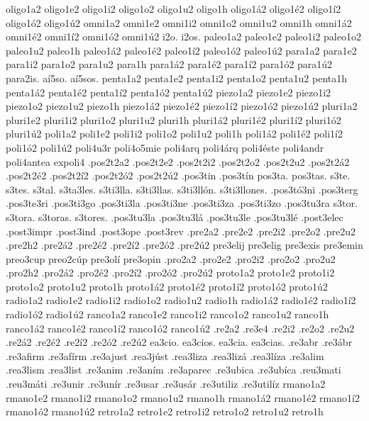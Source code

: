 {oligo1a2 oligo1e2 oligo1i2 oligo1o2 oligo1u2 oligo1h
oligo1^^e12 oligo1^^e92 oligo1^^ed2 oligo1^^f32 oligo1^^fa2
omni1a2 omni1e2 omni1i2 omni1o2 omni1u2 omni1h
omni1^^e12 omni1^^e92 omni1^^ed2 omni1^^f32 omni1^^fa2
i2o. i2os.
paleo1a2 paleo1e2 paleo1i2 paleo1o2 paleo1u2 paleo1h
paleo1^^e12 paleo1^^e92 paleo1^^ed2 paleo1^^f32 paleo1^^fa2
para1a2 para1e2 para1i2 para1o2 para1u2 para1h
para1^^e12 para1^^e92 para1^^ed2 para1^^f32 para1^^fa2
para2is. a^^ed5so. a^^ed5sos.
penta1a2 penta1e2 penta1i2 penta1o2 penta1u2 penta1h
penta1^^e12 penta1^^e92 penta1^^ed2 penta1^^f32 penta1^^fa2
piezo1a2 piezo1e2 piezo1i2 piezo1o2 piezo1u2 piezo1h
piezo1^^e12 piezo1^^e92 piezo1^^ed2 piezo1^^f32 piezo1^^fa2
pluri1a2 pluri1e2 pluri1i2 pluri1o2 pluri1u2 pluri1h
pluri1^^e12 pluri1^^e92 pluri1^^ed2 pluri1^^f32 pluri1^^fa2
poli1a2 poli1e2 poli1i2 poli1o2 poli1u2 poli1h
poli1^^e12 poli1^^e92 poli1^^ed2 poli1^^f32 poli1^^fa2
poli4u3r
poli4o5mie
poli4arq poli4^^e1rq
poli4^^e9ste
poli4andr
poli4antea
expoli4
.pos2t2a2 .pos2t2e2 .pos2t2i2 .pos2t2o2 .pos2t2u2
.pos2t2^^e12 .pos2t2^^e92 .pos2t2^^ed2 .pos2t2^^f32 .pos2t2^^fa2
.pos3tin .pos3t^^edn
pos3ta. pos3tas.
s3te. s3tes. s3tal. s3ta3les.
s3ti3lla. s3ti3llas. s3ti3ll^^f3n. s3ti3llones.
.pos3t^^f33ni
.pos3terg
.pos3te3ri
.pos3ti3go
.pos3ti3la
.pos3ti3ne
.pos3ti3za .pos3ti3zo
.pos3tu3ra
s3tor. s3tora. s3toras. s3tores.
.pos3tu3la .pos3tu3l^^e1 .pos3tu3le .pos3tu3l^^e9
.post3elec
.post3impr
.post3ind
.post3ope
.post3rev
.pre2a2 .pre2e2 .pre2i2 .pre2o2 .pre2u2 .pre2h2
.pre2^^e12 .pre2^^e92 .pre2^^ed2 .pre2^^f32 .pre2^^fa2
pre3elij pre3elig
pre3exis
pre3emin
preo3cup preo2c^^fap
pre3ol^^ed
pre3opin
.pro2a2 .pro2e2 .pro2i2 .pro2o2 .pro2u2 .pro2h2
.pro2^^e12 .pro2^^e92 .pro2^^ed2 .pro2^^f32 .pro2^^fa2
proto1a2 proto1e2 proto1i2 proto1o2 proto1u2 proto1h
proto1^^e12 proto1^^e92 proto1^^ed2 proto1^^f32 proto1^^fa2
radio1a2 radio1e2 radio1i2 radio1o2 radio1u2 radio1h
radio1^^e12 radio1^^e92 radio1^^ed2 radio1^^f32 radio1^^fa2
ranco1a2 ranco1e2 ranco1i2 ranco1o2 ranco1u2 ranco1h
ranco1^^e12 ranco1^^e92 ranco1^^ed2 ranco1^^f32 ranco1^^fa2
.re2a2 .re3e4 .re2i2 .re2o2 .re2u2
.re2^^e12 .re2^^e92 .re2^^ed2 .re2^^f32 .re2^^fa2
ea3cio. ea3cios. ea3cia. ea3cias.
.re3abr .re3^^e1br
.re3afirm .re3af^^edrm
.re3ajust .rea3j^^fast
.rea3liza .rea3liz^^e1 .rea3l^^edza
.re3alim
.rea3lism .rea3list
.re3anim .re3an^^edm
.re3aparec
.re3ubica .re3ub^^edca
.reu3mati .reu3m^^e1ti
.re3unir .re3un^^edr
.re3usar .re3us^^e1r
.re3utiliz .re3util^^edz
rmano1a2 rmano1e2 rmano1i2 rmano1o2 rmano1u2 rmano1h
rmano1^^e12 rmano1^^e92 rmano1^^ed2 rmano1^^f32 rmano1^^fa2
retro1a2 retro1e2 retro1i2 retro1o2 retro1u2 retro1h
}
